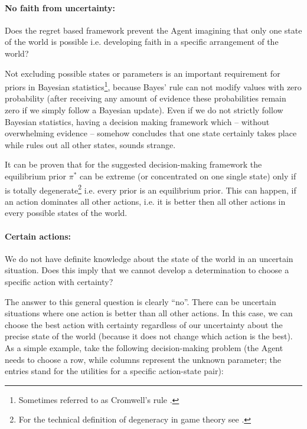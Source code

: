 \documentclass{article}
\begin{document}
\paragraph{No faith from uncertainty:}
Does the regret based framework prevent the Agent imagining that only one state of the world is possible i.e. developing faith in a specific arrangement of the world?

Not excluding possible states or parameters is an important requirement for priors in Bayesian statistics\footnote{Sometimes referred to as Cromwell's rule \cite{book:Lindley,book:BayesianSocialScience}.}, because Bayes' rule can not modify values with zero probability (after receiving any amount of evidence these probabilities remain zero if we simply follow a Bayesian update).
Even if we do not strictly follow Bayesian statistics, having a decision making framework which -- without overwhelming evidence -- somehow concludes that one state certainly takes place while rules out all other states, sounds strange.

It can be proven that for the suggested decision-making framework the equilibrium prior $\pi^*$ can be extreme (or concentrated on one single state) only if is totally degenerate\footnote{For the technical definition of degeneracy in game theory see \cite{book:AlgorithmicGameTheory,book:HandbookOfGameTheoryVol3,web:DegeneracySage,chapter:EquilibriaForTwoPersonGames}.} i.e. every prior is an equilibrium prior. This can happen, if an action dominates all other actions, i.e. it is better then all other actions in every possible states of the world.


\paragraph{Certain actions:}
\label{par:CertainActions}
We do not have definite knowledge about the state of the world in an uncertain situation. Does this imply that we cannot develop a determination to choose a specific action with certainty?

The answer to this general question is clearly ``no''. There can be uncertain situations where one action is better than all other actions. In this case, we can choose the best action with certainty regardless of our uncertainty about the precise state of the world (because it does not change which action is the best).
As a simple example, take the following decision-making problem (the Agent needs to choose a row, while columns represent the unknown parameter; the entries stand for the utilities for a specific action-state pair):
\end{document}
